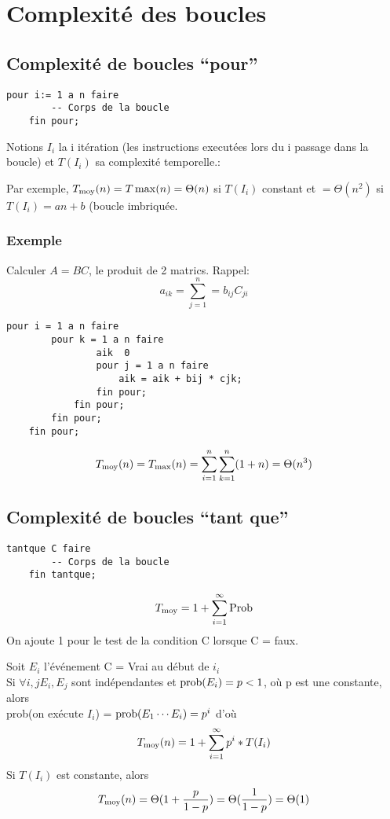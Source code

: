 \chapter{Complexité des boucles}
	\section{Complexité de boucles ``pour''}
\begin{lstlisting}[language=algo]
	pour i:= 1 a n faire
		-- Corps de la boucle
	fin pour;
\end{lstlisting}
Notions $I_i$ la i\ieme{} itération (les instructions executées lors du i\ieme{} passage dans la boucle) et $T(I_i)$ sa complexité temporelle.:

Par exemple, $T_\moy(n) = T\max(n) = \Theta(n)$ si $T(I_i)$ constant et $= \Theta(n^2)$ si $T(I_i) = an+b$ (boucle imbriquée.

\subsection{Exemple}
Calculer $A=BC$, le produit de 2 matrics. Rappel:
$$a_{ik} = \sum^n_{j=1} = b_{ij}C_{ji}$$
\begin{lstlisting}[language=algo]
	pour i = 1 a n faire
		pour k = 1 a n faire
				aik  0
				pour j = 1 a n faire
					aik = aik + bij * cjk;
				fin pour;
			fin pour;
		fin pour;
	fin pour;
\end{lstlisting}

$$T_{\moy}(n) = T_{\max}(n) = \sum^n_{i=1}\sum^n_{k=1}(1+n) = \Theta(n^3)$$

\newpage
\section{Complexité de boucles ``tant que''}\label{complexiteboucletantque}

\begin{lstlisting}[language=algo]
	tantque C faire
		-- Corps de la boucle
	fin tantque;
\end{lstlisting}
$$T_{\moy} = 1 + \sum^\infty_{i=1}\textrm{Prob}$$
On ajoute 1 pour le test de la condition C lorsque C = faux.

Soit $E_i$ l'événement C = Vrai au début de $i_i$\\
Si $\forall i, j E_i, E_j$ sont indépendantes et $\prob(E_i) = p < 1$, où p est une constante, alors\\ prob(on exécute $I_i$) = $\prob(E_1\cdots E_i) = p^i$ d'où
$$T_{\moy}(n) = 1 + \sum^{\infty}_{i=1}p^i*T(I_i)$$
Si $T(I_i)$ est constante, alors $$T_{\moy}(n) = \Theta (1 + \frac{p}{1-p}) = \Theta (\frac{1}{1-p}) = \Theta(1)$$

